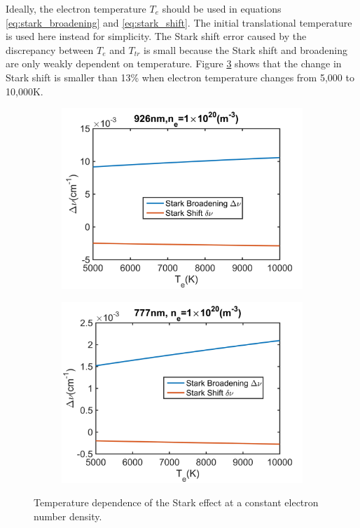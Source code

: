\documentclass[12pt]{iopart}
\begin{document}
Ideally, the electron temperature $T_e$ should be used in equations \ref{eq:stark_broadening} and \ref{eq:stark_shift}. The initial translational temperature is used here instead for simplicity.  The Stark shift error caused by the discrepancy between $T_e$ and $T_{tr}$ is small because the Stark shift and broadening are only weakly dependent on temperature.  Figure \ref{fig:delta_vs_Tdependance} shows that the change in Stark shift is smaller than 13\% when electron temperature changes from 5,000 to 10,000K. 
\begin{figure}[h]
  \centering
    \begin{subfigure}[b]{0.4\textwidth}
     \includegraphics[width=\textwidth]{delta_vs_Tdependance_926.jpg}
    \caption{\label{fig:delta_vs_Tdependance_926} }  
      \end{subfigure} %
      \begin{subfigure}[b]{0.4\textwidth}
     \includegraphics[width=\textwidth]{delta_vs_Tdependance_777.jpg}
      \caption{\label{fig:delta_vs_Tdependance_777} }
      \end{subfigure}
    \caption{\label{fig:delta_vs_Tdependance} Temperature dependence of the Stark effect at a constant electron number density. }
\end{figure}
\end{document}
